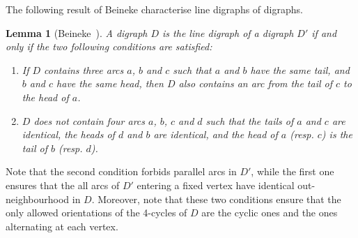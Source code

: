 \documentclass[11pt,a4aper]{article}
\newtheorem{lemma}[theorem]{Lemma}
\begin{document}
The following result of Beineke characterise line digraphs of digraphs.
\begin{lemma}[Beineke~\cite{beineke1968Derived}]\label{lem:forbidden_config}
  A digraph $D$ is the line digraph of a digraph $D'$ if and only if the two
  following conditions are satisfied:
  \begin{enumerate}
  \item If $D$ contains three arcs $a$, $b$ and $c$ such that $a$ and $b$ have
    the same tail, and $b$ and $c$ have the same head, then $D$ also contains an
    arc from the tail of $c$ to the head of $a$.
  \item $D$ does not contain four arcs $a$, $b$, $c$ and $d$ such that the tails
    of $a$ and $c$ are identical, the heads of $d$ and $b$ are identical, and
    the head of $a$ (resp. $c$) is the tail of $b$ (resp. $d$).  
  \end{enumerate}
\end{lemma}

  

Note that the second condition forbids parallel arcs in $D'$, while the first
one ensures that the all arcs of $D'$ entering a fixed vertex have identical
out-neighbourhood in $D$. Moreover, note
that these two conditions ensure that the only allowed orientations of the 4-cycles
of $D$ are the cyclic ones and the ones alternating at each vertex.
\end{document}
